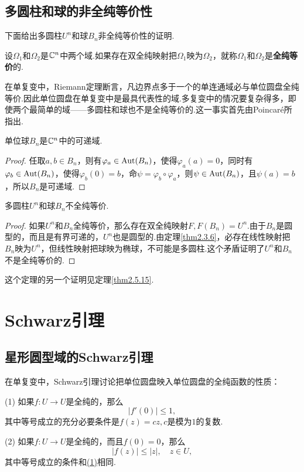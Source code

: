 \subsection{多圆柱和球的非全纯等价性}
下面给出多圆柱$U^n$和球$B_n$非全纯等价性的证明.
\begin{definition}\label{def2.3.13}
	设$\Omega_1$和$\Omega_2$是$\mathbb C^n$中两个域.如果存在双全纯映射把$\Omega_1$映为$\Omega_2$，就称$\Omega_1$和$\Omega_2$是\textbf{全纯等价}的.
\end{definition}
在单复变中，Riemann定理断言，凡边界点多于一个的单连通域必与单位圆盘全纯等价.因此单位圆盘在单复变中是最具代表性的域.多复变中的情况要复杂得多，即使两个最简单的域——多圆柱和球也不是全纯等价的.这一事实首先由Poincar\'e所指出.
\begin{theorem}\label{thm2.3.14}
	单位球$B_n$是$\mathbb C^n$中的可递域.
\end{theorem}
\begin{proof}
	任取$a,b\in B_n$，则有$\varphi_a\in\operatorname{Aut}(B_n)$，使得$\varphi_a(a)=0$，同时有$\varphi_b\in\operatorname{Aut}(B_n)$，使得$\varphi_b(0)=b$，命$\psi=\varphi_b\circ\varphi_a$，则$\psi\in\operatorname{Aut}(B_n)$，且$\psi(a)=b$，所以$B_n$是可递域.
\end{proof}
\begin{theorem}\label{thm2.3.15}
	多圆柱$U^n$和球$B_n$不全纯等价.
\end{theorem}
\begin{proof}
	如果$U^n$和$B_n$全纯等价，那么存在双全纯映射$F,F(B_n)=U^n$.由于$B_n$是圆型的，而且是有界可递的，$U^n$也是圆型的.由定理\ref{thm2.3.6}，必存在线性映射把$B_n$映为$U^n$，但线性映射把球映为椭球，不可能是多圆柱.这个矛盾证明了$U^n$和$B_n$不是全纯等价的.
\end{proof}
这个定理的另一个证明见定理\ref{thm2.5.15}.
\section{Schwarz引理\label{sec2.4}}
\subsection{星形圆型域的Schwarz引理}
在单复变中，Schwarz引理讨论把单位圆盘映入单位圆盘的全纯函数的性质：

(1)\hypertarget{2.4}{}
如果$f\colon U\to U$是全纯的，那么
\[|f'(0)|\le1,\]
其中等号成立的充分必要条件是$f(z)=cz,c$是模为$1$的复数.

(2)\hypertarget{2.4}{}
如果$f\colon U\to U$是全纯的，而且$f(0)=0$，那么
\[|f(z)|\le|z|,\quad z\in U,\]
其中等号成立的条件和\hyperlink{2.4}{(1)}相同.

